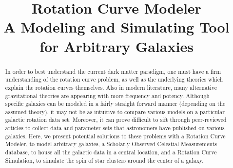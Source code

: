 \documentclass[conference]{IEEEtran-modified}
\begin{document}
\title{Rotation Curve Modeler \\ \Large{A Modeling and Simulating Tool for Arbitrary Galaxies}}

\author{
\and
{}
}

\onecolumn

%	
%

	\maketitle
    \begin{abstract}
	
	In order to best understand the current dark matter paradigm, one must have a firm understanding of the rotation curve problem, as well as the underlying theories which explain the rotation curves themselves.  Also in modern literature, many alternative gravitational theories are appearing with more frequency and potency. Although specific galaxies can be modeled in a fairly straight forward manner (depending on the assumed theory), it may not be as intuitive to compare various models on a particular galactic rotation data set.  Moreover, it can prove difficult to sift through peer-reviewed articles to collect data and parameter sets that astronomers have published on various galaxies. Here, we present potential solutions to these problems with a Rotation Curve Modeler, to model arbitrary galaxies, a Scholarly Observed Celestial Measurements database, to house all the galactic data in a central location, and a Rotation Curve Simulation, to simulate the spin of star clusters around the center of a galaxy.
	\end{abstract}
	
\end{document}
